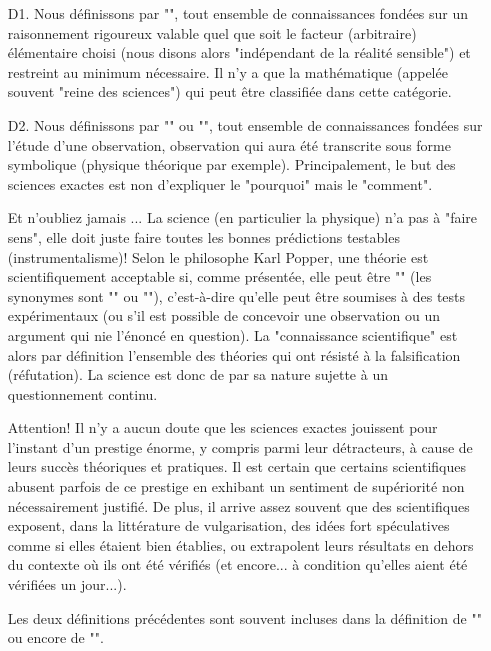 \begin{itemize}
	\item[D1.] Nous définissons par "", tout ensemble de connaissances fondées sur un raisonnement rigoureux valable quel que soit le facteur (arbitraire) élémentaire choisi (nous disons alors "indépendant de la réalité sensible") et restreint au minimum nécessaire. Il n'y a que la mathématique (appelée souvent "reine des sciences") qui peut être classifiée dans cette catégorie.

	\item[D2.] Nous définissons par "" ou "", tout ensemble de connaissances fondées sur l'étude d'une observation, observation qui aura été transcrite sous forme symbolique (physique théorique par exemple). Principalement, le but des sciences exactes est non d'expliquer le "pourquoi" mais le "comment".
	
	Et n'oubliez jamais ... La science (en particulier la physique) n'a pas à "faire sens", elle doit juste faire toutes les bonnes prédictions testables (instrumentalisme)! Selon le philosophe Karl Popper, une théorie est scientifiquement acceptable si, comme présentée, elle peut être "" (les synonymes sont "" ou ""), c'est-à-dire qu'elle peut être soumises à des tests expérimentaux (ou s'il est possible de concevoir une observation ou un argument qui nie l'énoncé en question). La "connaissance scientifique" est alors par définition l'ensemble des théories qui ont résisté à la falsification (réfutation). La science est donc de par sa nature sujette à un questionnement continu.
	
	Attention! Il n'y a aucun doute que les sciences exactes jouissent pour l'instant d'un prestige énorme, y compris parmi leur détracteurs, à cause de leurs succès théoriques et pratiques. Il est certain que certains scientifiques abusent parfois de ce prestige en exhibant un sentiment de supériorité non nécessairement justifié. De plus, il arrive assez souvent que des scientifiques exposent, dans la littérature de vulgarisation, des idées fort spéculatives comme si elles étaient bien établies, ou extrapolent leurs résultats en dehors du contexte où ils ont été vérifiés (et encore... à condition qu'elles aient été vérifiées un jour...).

	\begin{tcolorbox}[title=Remark,colframe=black,arc=10pt]
	Les deux définitions précédentes sont souvent incluses dans la définition de "" ou encore de "".
	\end{tcolorbox}
	

\end{itemize}
